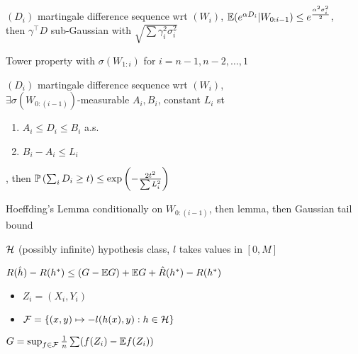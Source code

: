 \begin{lemma}
    $(D_i)$ martingale difference sequence wrt $(W_i)$, $\mathbb{E} (e^{\alpha D_i} | W_{0:{i-1}}) \leq e^{\frac{\alpha^2 \sigma_i^2}{2}}$, \\
    then $\gamma^\top D$ sub-Gaussian with $\sqrt{\sum \gamma_i^2 \sigma_i^2}$
\end{lemma}
\begin{pf}
    Tower property with $\sigma(W_{1:i})$ for $i=n-1, n-2, \dots, 1$
\end{pf}

\begin{thm}
    $(D_i)$ martingale difference sequence wrt $(W_i)$,\\ $\exists \sigma(W_{0:(i-1)})$-measurable $A_i, B_i$, constant $L_i$ st
    \begin{enumerate}
        \item $A_i \leq D_i \leq B_i$ a.s.\ 
        \item $B_i - A_i \leq L_i$
    \end{enumerate}, then $\mathbb{P}\left( \sum_i D_i \geq t \right) \leq \exp\left( - \frac{2t^2}{\sum L_i^2} \right)$
\end{thm}
\begin{pf}
    Hoeffding's Lemma conditionally on $W_{0:(i-1)}$, then lemma, then Gaussian tail bound
\end{pf}

\begin{setting}
    $\mathcal{H}$ (possibly infinite) hypothesis class, $l$ takes values in $[0, M]$
\end{setting}
\begin{fact}
    $R(\hat h) - R(h^*) \leq (G - \mathbb{E} G) + \mathbb{E} G + \hat R(h^*) - R(h^*)$
\end{fact}

\begin{itemize}
    \item $Z_i = (X_i, Y_i)$
    \item $\mathcal{F} = \left\{ (x,y) \mapsto -l(h(x), y) : h \in \mathcal{H} \right\}$
\end{itemize}
\begin{fact}
    $G = \sup_{f \in \mathcal{F}} \frac{1}{n} \sum (f(Z_i) - \mathbb{E} f(Z_i))$
\end{fact}

